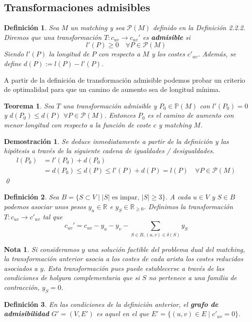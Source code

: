 \documentclass[twoside,a4paper,openright,12pt,tikz]{book}
\newtheorem{defi}{Definici\'on}[section]
\newtheorem{nota}{Nota}[section]
\newtheorem{thm}{Teorema}[section]
\newtheorem*{dem}{Demostración}
\newcommand{\R}{\mathbb{R}}
\begin{document}
\subsection{Transformaciones admisibles}
\begin{defi}
Sea $M$ un matching y sea $\mathcal{P}(M)$ definido en la Definición 2.2.2. Diremos que una transformación $T:c_{uv}\to c_{uv}'$  es \textbf{admisible} si
$$
l'(P)\geq 0\quad \forall P \in \mathcal{P}(M)
$$
Siendo $l'(P)$ la longitud de $P$ con respecto a $M$ y los costes $c'_{uv}$. Además, se define $d(P):= l(P)-l'(P)$.
\end{defi}
A partir de la definición de transformación admisible podemos probar un criterio de optimalidad para que un camino de aumento sea de longitud mínima.
\begin{thm}
Sea $T$ una transformación admisible y $P_0 \in \mathbb{P}(M)$ con $l'(P_0) =0$ y 	$d(P_0)\leq d(P)$ $\forall P \in \mathcal{P}(M)$. Entonces $P_0$ es el camino de aumento con menor longitud con respecto a la función de coste $c$ y matching $M$.
\end{thm}
\begin{dem}
Se deduce inmediatamente a partir de la definición y las hipótesis a través de la siguiente cadena de igualdades / desigualdades.
\begin{align*}
l(P_0) &= l'(P_0) + d(P_0)\\
&=d(P_0)\leq d(P) \leq l'(P) + d(P) = l(P)  \quad \forall P \in \mathcal{P}(M)
\end{align*}
\qed
\end{dem}
\begin{defi}
Sea $B=\{S\subset V \mid |S| \text{ es impar, }|S|\geq 3\}$. A cada $u\in V$ y $S\in B$ podemos asociar unos pesos $y_u \in \R$ e $y_S \in \R_{\geq 0}$. Definimos la transformación $T:c_{uv}\to c'_{uv}$ tal que
$$
c_{uv}' =c_{uv}-y_u-y_v - \sum_{S\in B, (u,v)\in \delta(S)}y_S
$$
\end{defi}
\begin{nota}
Si consideramos $y$ una solución factible del problema dual del matching, la transformación anterior asocia a los costes de cada arista los costes reducidos asociados a $y$. Esta transformación pues puede establecerse a través de las condiciones de holgura complementaria que si $S$ no pertenece a una familia de contracción, $y_S =0$.
\end{nota}
\begin{defi}
En las condiciones de la definición anterior, el \textbf{grafo de admisibilidad} $G' = (V,E')$ es aquel en el que $E' = \{(u,v)\in E\mid c'_{uv}=0\}$.
\end{defi}
\end{document}
